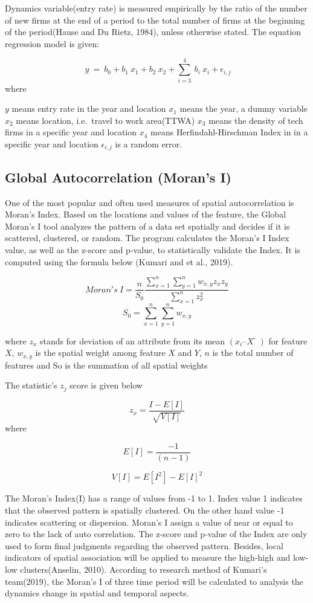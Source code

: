 \documentclass[
  12pt,
  oneside]{book}
\begin{document}
Dynamics variable(entry rate) is measured empirically by the ratio of the number of new firms at the end of a period to the total number of firms at the beginning of the period(Hause and Du Rietz, 1984), unless otherwise stated. The equation regression model is given:

\[
\ y\ =\ b_0 + b_1 \ x_1 + b_2 \ x_2 + \sum_{i=3}^{4} \ b_i \ x_i + \epsilon_{i,j}
\]
where

\(y\) means entry rate in the year and location
\(x_1\) means the year, a dummy variable
\(x_2\) means location, i.e.~travel to work area(TTWA)
\(x_3\) means the density of tech firms in a specific year and location
\(x_4\) means Herfindahl-Hirschman Index in in a specific year and location
\(\epsilon_{i,j}\) is a random error.

\hypertarget{global-autocorrelation-morans-i}{%
\subsection{Global Autocorrelation (Moran's I)}\label{global-autocorrelation-morans-i}}

One of the most popular and often used measures of spatial autocorrelation is Moran's Index. Based on the locations and values of the feature, the Global Moran's I tool analyzes the pattern of a data set spatially and decides if it is scattered, clustered, or random. The program calculates the Moran's I Index value, as well as the z-score and p-value, to statistically validate the Index. It is computed using the formula below (Kumari and et al., 2019).

\[
Moran's \ I = \frac{n}{S_0} \frac{\sum_{x=1}^n \sum_{y=1}^n w_{x,y} z_x z_y}{\sum_{x=1}^n z_x^2}
\]
\[
S_0 = \sum_{x=1}^n \sum_{y=1}^n w_{x,y}
\]

where \(z_x\) stands for deviation of an attribute from its mean \((x_i – X̅)\) for feature \(X\), \(w_{x,y}\) is the spatial weight among feature \(X\) and \(Y\), \(n\) is the total number of features and So is the summation of all spatial weights

The statistic's \(z_j\) score is given below

\[ 
z_x = \frac{I - E[I]}{\sqrt{V[I]}}
\]
where

\[
E[I] = \frac{-1}{(n-1)}
\]

\[
V[I] = E[I^2]-E[I]^2
\]

The Moran's Index(I) has a range of values from -1 to 1. Index value 1 indicates that the observed pattern is spatially clustered. On the other hand value -1 indicates scattering or dispersion. Moran's I assign a value of near or equal to zero to the lack of auto correlation. The z-score and p-value of the Index are only used to form final judgments regarding the observed pattern. Besides, local indicators of spatial association will be applied to measure the high-high and low-low clusters(Anselin, 2010). According to research method of Kumari's team(2019), the Moran's I of three time period will be calculated to analysis the dynamics change in spatial and temporal aspects.
\end{document}
